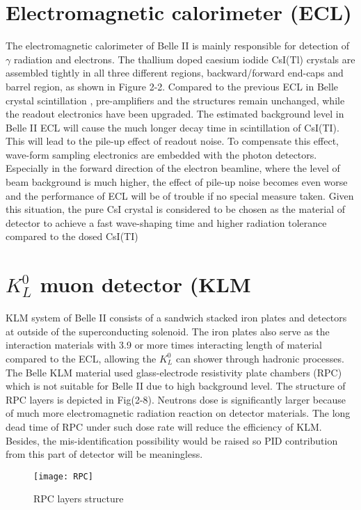\section{Electromagnetic calorimeter (ECL)}
The electromagnetic calorimeter of Belle II is mainly responsible for detection of $\gamma$ radiation and electrons. The  thallium doped caesium iodide CsI(Tl) crystals are assembled tightly in all three different regions, backward/forward end-caps and barrel region, as shown in Figure 2-2. Compared to the previous ECL in Belle crystal scintillation , pre-amplifiers and the structures remain unchanged, while the readout  electronics have been upgraded. The estimated background level in Belle II ECL will cause the much longer decay time in scintillation of CsI(TI). This will lead to the pile-up effect of readout noise. To compensate this effect, wave-form sampling electronics are embedded with the photon detectors. Especially in the forward direction of the electron beamline, where the level of beam background is much higher, the effect of pile-up noise becomes even worse and the performance of ECL will be of trouble if no special measure taken. Given this situation, the pure CsI crystal is considered to be chosen as the material of detector to achieve a fast wave-shaping time and higher radiation tolerance compared to the dosed CsI(TI)

\section{$K_L^0$ muon detector (KLM}
KLM system of Belle II consists of a sandwich stacked iron plates and detectors at outside of the superconducting solenoid. The iron plates also serve as the interaction materials with 3.9 or more times interacting length of material compared to the ECL, allowing the $K_L^0$ can shower through hadronic processes. 
The Belle KLM material used  glass-electrode resistivity plate chambers (RPC) which is not suitable for Belle II due to high background level. The structure of RPC layers is depicted in Fig(2-8). Neutrons dose is significantly larger because of much more electromagnetic radiation reaction on detector materials. The long dead time of RPC under such dose rate will reduce the efficiency of KLM. Besides, the mis-identification possibility would be raised so PID contribution from this part of detector will be meaningless.

\begin{figure}[htbp]
	\centering
	\texttt{[image: RPC]}
	\caption{ RPC layers structure\cite{b2book}}
\end{figure}


